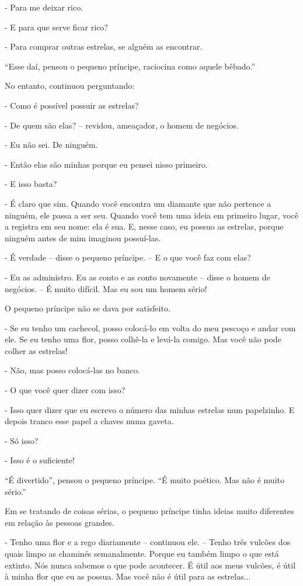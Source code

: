 - Para me deixar rico.

- E para que serve ficar rico?

- Para comprar outras estrelas, se alguém as encontrar.

``Esse daí, pensou o pequeno príncipe, raciocina como aquele bêbado.''

No entanto, continuou perguntando:

- Como é possível possuir as estrelas?

- De quem são elas? -- revidou, ameaçador, o homem de negócios.

- Eu não sei. De ninguém.

- Então elas são minhas porque eu pensei nisso primeiro.

- E isso basta?

- É claro que sim. Quando você encontra um diamante que não pertence a
ninguém, ele passa a ser seu. Quando você tem uma ideia em primeiro
lugar, você a registra em seu nome: ela é sua. E, nesse caso, eu possuo
as estrelas, porque ninguém antes de mim imaginou possuí-las.

- É verdade -- disse o pequeno príncipe. -- E o que você faz com elas?

- Eu as administro. Eu as conto e as conto novamente -- disse o homem de
negócios. -- É muito difícil. Mas eu sou um homem sério!

O pequeno príncipe não se dava por satisfeito.

- Se eu tenho um cachecol, posso colocá-lo em volta do meu pescoço e
andar com ele. Se eu tenho uma flor, posso colhê-la e levá-la comigo.
Mas você não pode colher as estrelas!

- Não, mas posso colocá-las no banco.

- O que você quer dizer com isso?

- Isso quer dizer que eu escrevo o número das minhas estrelas num
papelzinho. E depois tranco esse papel a chaves numa gaveta.

- Só isso?

- Isso é o suficiente!

``É divertido'', pensou o pequeno príncipe. ``É muito poético. Mas não é
muito sério.''

Em se tratando de coisas sérias, o pequeno príncipe tinha ideias muito
diferentes em relação às pessoas grandes.

- Tenho uma flor e a rego diariamente -- continuou ele. -- Tenho três
vulcões dos quais limpo as chaminés semanalmente. Porque eu também limpo
o que está extinto. Nós nunca sabemos o que pode acontecer. É útil aos
meus vulcões, é útil à minha flor que eu as possua. Mas você não é útil
para as estrelas...

